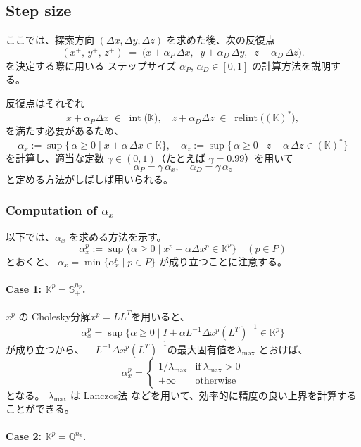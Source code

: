 \documentclass{jsarticle}
\begin{document}
\subsection{Step size} \label{sec:step_size}
ここでは、探索方向 $(\Delta x,\Delta y,\Delta z)$ を求めた後、次の反復点 
\[
  (x^+,\,y^+,\,z^+) 
  \;=\; 
  \bigl(x + \alpha_P\,\Delta x,\;\; y + \alpha_D\,\Delta y,\;\; z + \alpha_D\,\Delta z\bigr).
\]
を決定する際に用いる ステップサイズ $\alpha_P$, $\alpha_D \in [0, 1]$ の計算方法を説明する。

反復点はそれぞれ
\[
  x + \alpha_P \Delta x \;\in\; \operatorname{int}\bigl(\mathbb{K}\bigr),
  \quad
  z + \alpha_D \Delta z \;\in\; \operatorname{relint}\bigl((\mathbb{K})^*\bigr),
\]
を満たす必要があるため、
\[
  \alpha_x  := \sup \bigl\{\,\alpha \ge 0 \mid x + \alpha \,\Delta x \in \mathbb{K}\bigr\},
  \quad
  \alpha_z  := \sup \bigl\{\,\alpha \ge 0 \mid z + \alpha \,\Delta z \in (\mathbb{K})^*\bigr\}
\]
を計算し、適当な定数 $\gamma\in(0,1)$（たとえば $\gamma=0.99$）を用いて
\[
  \alpha_P 
    = \gamma \,\alpha_x, 
  \quad
  \alpha_D 
    = \gamma \,\alpha_z
\]
と定める方法がしばしば用いられる。

\subsubsection{Computation of $\alpha_x$}
以下では、$\alpha_x$ を求める方法を示す。  
\[\alpha^p_x:=\sup\{\alpha \geq 0 \mid x^p + \alpha \Delta x^p \in \mathbb{K}^p\} \quad (p\in P)\]
とおくと、 $\alpha_x=\min\{\alpha^p_x\mid p\in P\}$ が成り立つことに注意する。


\paragraph{Case 1: $\mathbb{K}^p = \mathbb{S}^{n_p}_+$.}

$x^p$ の Cholesky分解$x^p=LL^T$を用いると、
\[\alpha^p_x = \sup\{\alpha \geq 0 \mid I + \alpha L^{-1} \Delta x^p (L^T)^{-1} \in \mathbb{K}^p\}\]
が成り立つから、 $-L^{-1} \Delta x^p (L^T)^{-1}$の最大固有値を$\lambda_{\max}$ とおけば、
\[\alpha^p_x = \begin{cases}
    1/\lambda_{\max} & \text{if} ~ \lambda_{\max} > 0 \\
    +\infty & \text{otherwise}
\end{cases}\]
となる。
$\lambda_{\max}$ は Lanczos法 \cite{Golub2013} などを用いて、効率的に精度の良い上界を計算することができる。

\paragraph{Case 2: $\mathbb{K}^p = \mathbb{Q}^{n_p}$.}
\end{document}
